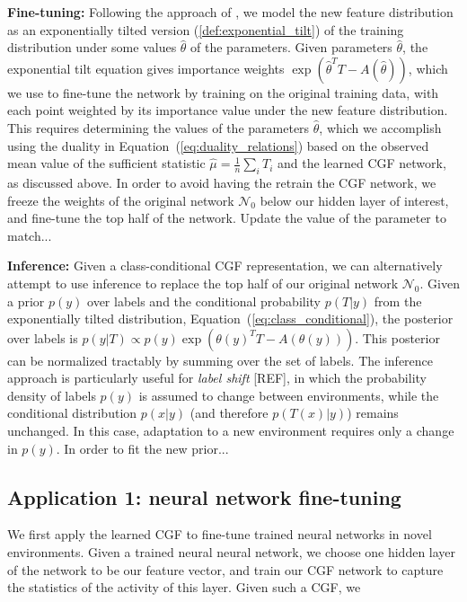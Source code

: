 \documentclass[11pt]{article}      %
\begin{document}
\noindent \textbf{Fine-tuning:} Following the approach of \cite{maity_understanding_2023}, we model the new feature distribution as an exponentially tilted version (\ref{def:exponential_tilt}) of the training distribution  under some values $\hat \theta$ of the parameters.
Given parameters $\hat \theta$, the exponential tilt equation gives importance weights ${\exp(\hat \theta^T T - A(\hat \theta))}$, which we use to fine-tune the network by training on the original training data, with each point weighted by its importance value under the new feature distribution.
This requires determining the values of the parameters $\hat \theta$, which we accomplish using the duality in Equation~(\ref{eq:duality_relations}) based on the observed mean value of the sufficient statistic ${\hat \mu = \frac{1}{n} \sum_i T_i}$ and the learned CGF network, as discussed above.
In order to avoid having the retrain the CGF network, we freeze the weights of the original network $\mathcal{N}_0$ below our hidden layer of interest, and fine-tune the top half of the network.
Update the value of the parameter to match...


\noindent \textbf{Inference:}
Given a class-conditional CGF representation, we can alternatively attempt to use inference to replace the top half of our original network $\mathcal{N}_0$.
Given a prior $p(y)$ over labels and the conditional probability $p(T|y)$ from the exponentially tilted distribution, Equation~(\ref{eq:class_conditional}), the posterior over labels is $p{(y|T) \propto p(y) \exp(\theta(y)^T T - A(\theta(y)))}$.
This posterior can be normalized tractably by summing over the set of labels.
The inference approach is particularly useful for \textit{label shift} [REF], in which the probability density of labels $p(y)$ is assumed to change between environments, while the conditional distribution $p(x|y)$ (and therefore $p(T(x)|y)$) remains unchanged.
In this case, adaptation to a new environment requires only a change in $p(y)$.
In order to fit the new prior...






\newpage
\subsection{Application 1: neural network fine-tuning}

We first apply the learned CGF to fine-tune trained neural networks in novel environments.
Given a trained neural neural network, we choose one hidden layer of the network to be our feature vector, and train our CGF network to capture the statistics of the activity of this layer.
Given such a CGF, we
\end{document}
